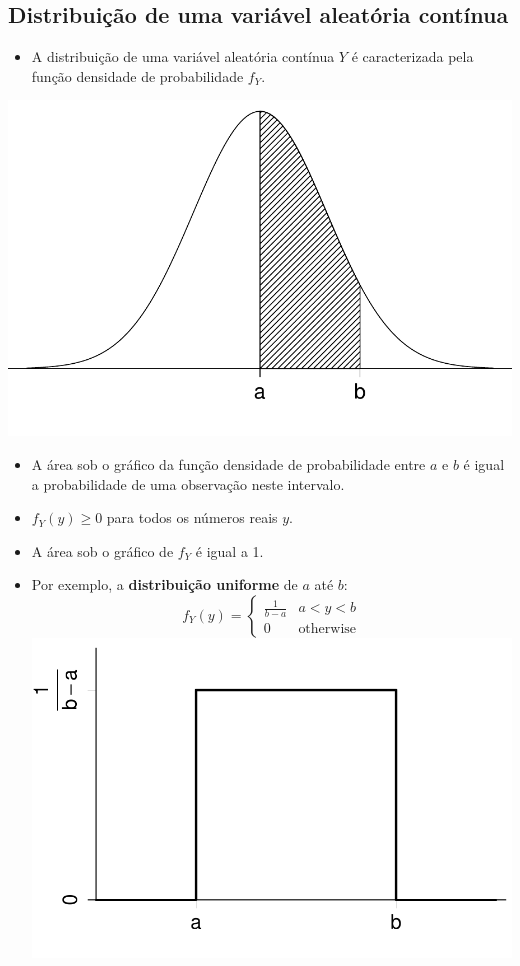 \documentclass[]{article}
\providecommand{\tightlist}{%
  \setlength{\itemsep}{0pt}\setlength{\parskip}{0pt}}
\begin{document}
\subsection{Distribuição de uma variável aleatória
contínua}\label{distribuicao-de-uma-variavel-aleatoria-continua}

\begin{itemize}
\tightlist
\item
  A distribuição de uma variável aleatória contínua \(Y\) é
  caracterizada pela função densidade de probabilidade \(f_Y\).
\end{itemize}

\includegraphics{probability_files/figure-latex/normprobs-1.pdf}

\begin{itemize}
\tightlist
\item
  A área sob o gráfico da função densidade de probabilidade entre \(a\)
  e \(b\) é igual a probabilidade de uma observação neste intervalo.
\item
  \(f_Y(y)\geq 0\) para todos os números reais \(y\).
\item
  A área sob o gráfico de \(f_Y\) é igual a 1.
\item
  Por exemplo, a \textbf{distribuição uniforme} de \(a\) até \(b\): \[
  f_Y(y)=
  \begin{cases}
    \frac{1}{b-a} & a<y<b \\
    0 & \text{otherwise}
  \end{cases}
  \] \includegraphics{probability_files/figure-latex/unifdist-1.pdf}
\end{itemize}
\end{document}
